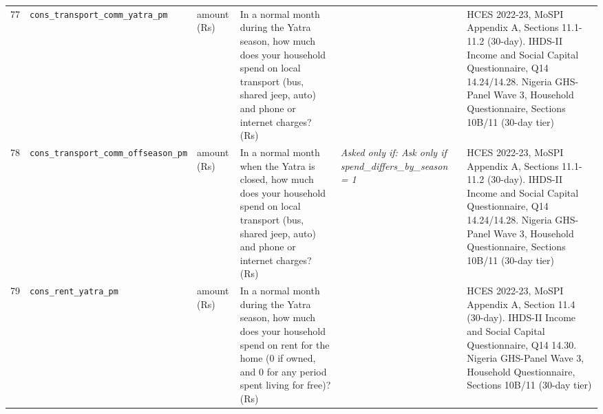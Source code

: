 \documentclass[9pt,a4paper,landscape]{article}
\begin{document}
\begin{longtable}{@{}p{0.5cm}p{3.3cm}p{1.7cm}p{7.3cm}p{5.6cm}p{5.4cm}@{}}
\footnotesize 77 & \footnotesize\texttt{cons\_transport\_comm\_yatra\_pm} & \scriptsize amount (Rs) & \footnotesize In a normal month during the Yatra season, how much does your household spend on local transport (bus, shared jeep, auto) and phone or internet charges? (Rs)\par\vspace{1pt}{\footnotesize\color{hdr}{\hifont यात्रा के मौसम के आम महीने में, आप (और जो यहाँ आपके साथ रहते हैं) आने-जाने (बस, जीप, ऑटो) और फ़ोन या इंटरनेट पर कितना ख़र्च करते हैं? (रुपये)}} & \scriptsize  & \scriptsize HCES 2022-23, MoSPI Appendix A, Sections 11.1-11.2 (30-day). IHDS-II Income and Social Capital Questionnaire, Q14 14.24/14.28. Nigeria GHS-Panel Wave 3, Household Questionnaire, Sections 10B/11 (30-day tier)\\
\footnotesize 78 & \footnotesize\texttt{cons\_transport\_comm\_offseason\_pm} & \scriptsize amount (Rs) & \footnotesize In a normal month when the Yatra is closed, how much does your household spend on local transport (bus, shared jeep, auto) and phone or internet charges? (Rs)\par\vspace{1pt}{\footnotesize\color{hdr}{\hifont जब यात्रा बंद रहती है, उस आम महीने में आपका घर आने-जाने (बस, जीप, ऑटो) और फ़ोन या इंटरनेट पर कितना ख़र्च करता है? (रुपये)}} & \scriptsize \textit{Asked only if: Ask only if spend\_differs\_by\_season = 1} & \scriptsize HCES 2022-23, MoSPI Appendix A, Sections 11.1-11.2 (30-day). IHDS-II Income and Social Capital Questionnaire, Q14 14.24/14.28. Nigeria GHS-Panel Wave 3, Household Questionnaire, Sections 10B/11 (30-day tier)\\
\footnotesize 79 & \footnotesize\texttt{cons\_rent\_yatra\_pm} & \scriptsize amount (Rs) & \footnotesize In a normal month during the Yatra season, how much does your household spend on rent for the home (0 if owned, and 0 for any period spent living for free)? (Rs)\par\vspace{1pt}{\footnotesize\color{hdr}{\hifont यात्रा के मौसम के आम महीने में, आप (और जो यहाँ आपके साथ रहते हैं) घर के किराये पर (अपना घर हो तो 0, और मुफ़्त रहे हों तो भी 0) कितना ख़र्च करते हैं? (रुपये)}} & \scriptsize  & \scriptsize HCES 2022-23, MoSPI Appendix A, Section 11.4 (30-day). IHDS-II Income and Social Capital Questionnaire, Q14 14.30. Nigeria GHS-Panel Wave 3, Household Questionnaire, Sections 10B/11 (30-day tier)\\

\end{longtable}
\end{document}

